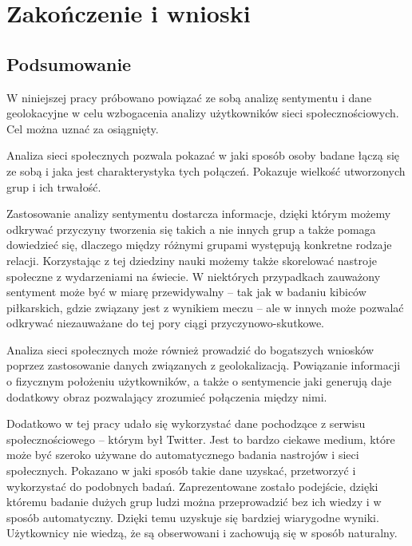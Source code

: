 \chapter{Zakończenie i wnioski}
\section{Podsumowanie}

W niniejszej pracy próbowano powiązać ze sobą analizę sentymentu i dane
geolokacyjne w celu wzbogacenia analizy użytkowników sieci społecznościowych.
Cel można uznać za osiągnięty.

Analiza sieci społecznych pozwala pokazać w jaki sposób osoby badane łączą się
ze sobą i jaka jest charakterystyka tych połączeń. Pokazuje wielkość
utworzonych grup i ich trwałość.

Zastosowanie analizy sentymentu dostarcza informacje, dzięki którym
możemy odkrywać przyczyny tworzenia się takich a nie innych grup
a także pomaga dowiedzieć się, dlaczego między różnymi grupami występują
konkretne rodzaje relacji. Korzystając z tej dziedziny nauki możemy także
skorelować nastroje społeczne z wydarzeniami na świecie. W niektórych przypadkach
zauważony sentyment może być w miarę przewidywalny -- tak jak w badaniu 
kibiców piłkarskich, gdzie związany jest z wynikiem meczu -- ale w innych
może pozwalać odkrywać niezauważane do tej pory ciągi przyczynowo-skutkowe.

Analiza sieci społecznych może również prowadzić do bogatszych wniosków
poprzez zastosowanie danych związanych z geolokalizacją. Powiązanie informacji
o fizycznym położeniu użytkowników, a także o sentymencie jaki generują
daje dodatkowy obraz pozwalający zrozumieć połączenia między nimi.

Dodatkowo w tej pracy udało się wykorzystać dane pochodzące z serwisu 
społecznościowego -- którym był Twitter.
Jest to bardzo ciekawe medium, które może być szeroko używane do automatycznego
badania nastrojów i sieci społecznych. Pokazano w jaki sposób takie dane
uzyskać, przetworzyć i wykorzystać do podobnych badań. Zaprezentowane zostało podejście,
dzięki któremu badanie dużych grup ludzi można przeprowadzić bez ich wiedzy
i w sposób automatyczny. Dzięki temu uzyskuje się bardziej wiarygodne wyniki.
Użytkownicy nie wiedzą, że są obserwowani i zachowują się w sposób naturalny.


